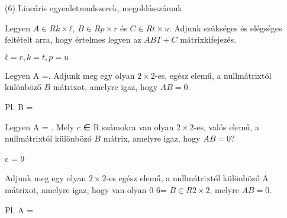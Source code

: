\begin{frame}[plain]
\begin{tcolorbox}[center, colback={myyellow}, coltext={black}, colframe={myyellow}]
    {\RHuge  (6) Lineáris egyenletrendszerek, megoldásszámuk}
    \mmedskip
\end{tcolorbox}
\end{frame}

\begin{frame}
  \begin{tcolorbox}[title={6/1. -N-}]
    Legyen $A ∈ Rk×ℓ$, $B ∈ Rp×r$ és $C ∈ Rt×u$. Adjunk szükséges és elégséges feltételt arra, hogy értelmes legyen az $ABT + C$ mátrixkifejezés.
  \tcblower

    \mmedskip 
    
    $ℓ = r, k = t, p = u$
  \end{tcolorbox}
\end{frame}


\begin{frame}
  \begin{tcolorbox}[title={6/2. -N-}]
    Legyen A =. Adjunk meg egy olyan $2×2$-es, egész elemű, a nullmátrixtól különböző $B$ mátrixot, amelyre igaz, hogy $AB = 0$.

  \tcblower

    \mmedskip 
    
    Pl. B =
  \end{tcolorbox}
\end{frame}


\begin{frame}
  \begin{tcolorbox}[title={6/3. -N-}]
     Legyen A = . Mely c ∈ R számokra van olyan $2×2$-es, valós elemű, a nullmátrixtól különböző $B$ mátrix, amelyre igaz, hogy $AB = 0$?
  \tcblower

    \mmedskip 
    
    c = 9
  \end{tcolorbox}
\end{frame}


\begin{frame}
  \begin{tcolorbox}[title={6/4. -N-}]
     Adjunk meg egy olyan $2×2$-es egész elemű, a nullmátrixtól különböző A mátrixot, amelyre igaz, hogy van olyan 0 6= $B ∈ R2×2$, melyre $AB = 0$.
  \tcblower

    \mmedskip 
    
    Pl. A =
  \end{tcolorbox}
\end{frame}


